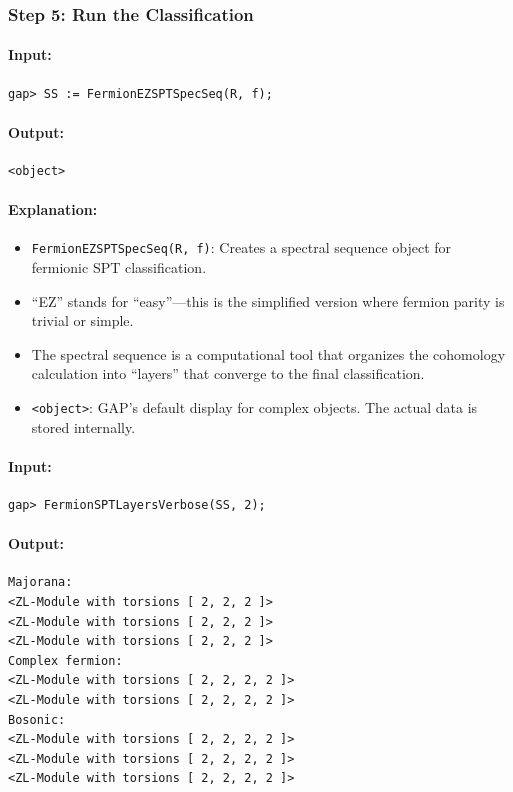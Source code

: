 \documentclass{SciPost}
\begin{document}
\subsubsection{Step 5: Run the Classification}

\paragraph{Input:}
\begin{verbatim}
gap> SS := FermionEZSPTSpecSeq(R, f);
\end{verbatim}

\paragraph{Output:}
\begin{verbatim}
<object>
\end{verbatim}

\paragraph{Explanation:}
\begin{itemize}
    \item \texttt{FermionEZSPTSpecSeq(R, f)}: Creates a spectral sequence object for fermionic SPT classification.
    \item ``EZ'' stands for ``easy''---this is the simplified version where fermion parity is trivial or simple.
    \item The spectral sequence is a computational tool that organizes the cohomology calculation into ``layers'' that converge to the final classification.
    \item \texttt{<object>}: GAP's default display for complex objects. The actual data is stored internally.
\end{itemize}

\paragraph{Input:}
\begin{verbatim}
gap> FermionSPTLayersVerbose(SS, 2);
\end{verbatim}

\paragraph{Output:}
\begin{verbatim}
Majorana:
<ZL-Module with torsions [ 2, 2, 2 ]>
<ZL-Module with torsions [ 2, 2, 2 ]>
<ZL-Module with torsions [ 2, 2, 2 ]>
Complex fermion:
<ZL-Module with torsions [ 2, 2, 2, 2 ]>
<ZL-Module with torsions [ 2, 2, 2, 2 ]>
Bosonic:
<ZL-Module with torsions [ 2, 2, 2, 2 ]>
<ZL-Module with torsions [ 2, 2, 2, 2 ]>
<ZL-Module with torsions [ 2, 2, 2, 2 ]>
\end{verbatim}
\end{document}
